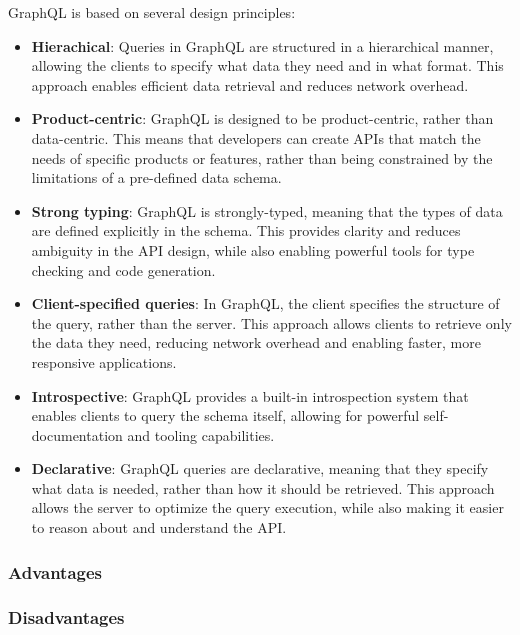 GraphQL is based on several design principles: \cite{misc:-:background:graphql:graphql-specification}

\begin{itemize}
    \item \textbf{Hierachical}: Queries in GraphQL are structured in a hierarchical manner, allowing the clients to specify what data they need and in what format. This approach enables efficient data retrieval and reduces network overhead.
    
    \item \textbf{Product-centric}: GraphQL is designed to be product-centric, rather than data-centric. This means that developers can create APIs that match the needs of specific products or features, rather than being constrained by the limitations of a pre-defined data schema.
    
    \item \textbf{Strong typing}: GraphQL is strongly-typed, meaning that the types of data are defined explicitly in the schema. This provides clarity and reduces ambiguity in the API design, while also enabling powerful tools for type checking and code generation.
    
    \item \textbf{Client-specified queries}: In GraphQL, the client specifies the structure of the query, rather than the server. This approach allows clients to retrieve only the data they need, reducing network overhead and enabling faster, more responsive applications.
    
    \item \textbf{Introspective}: GraphQL provides a built-in introspection system that enables clients to query the schema itself, allowing for powerful self-documentation and tooling capabilities.

    \item \textbf{Declarative}: GraphQL queries are declarative, meaning that they specify what data is needed, rather than how it should be retrieved. This approach allows the server to optimize the query execution, while also making it easier to reason about and understand the API.
\end{itemize}

\subsubsection{Advantages}

\subsubsection{Disadvantages}







